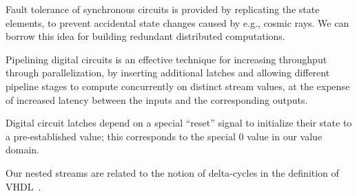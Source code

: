 Fault tolerance of synchronous circuits is provided by replicating the
state elements, to prevent accidental state changes caused by e.g.,
cosmic rays.  We can borrow this idea for building redundant
distributed computations.

Pipelining digital circuits is an effective technique for increasing
throughput through parallelization, by inserting additional latches
and allowing different pipeline stages to compute concurrently on
distinct stream values, at the expense of increased latency between
the inputs and the corresponding outputs.

Digital circuit latches depend on a special ``reset'' signal to
initialize their state to a pre-established value; this corresponds to
the special 0 value in our value domain.

Our nested streams are related to the notion of delta-cycles in the
definition of VHDL~\cite{baker-date96}.
